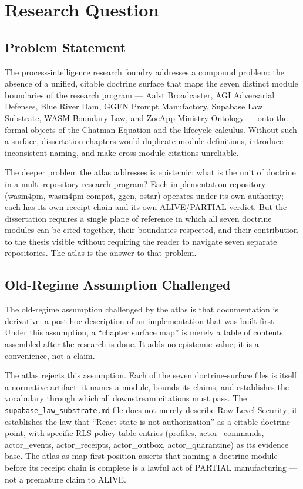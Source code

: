 
\section{Research Question}
\label{sec:atlas-rq}

\subsection{Problem Statement}
\label{sec:atlas-rq-problem}

The process-intelligence research foundry addresses a compound problem: the
absence of a unified, citable doctrine surface that maps the seven distinct
module boundaries of the research program --- Aalst Broadcaster, AGI Adversarial
Defenses, Blue River Dam, GGEN Prompt Manufactory, Supabase Law Substrate, WASM
Boundary Law, and ZoeApp Ministry Ontology --- onto the formal objects of the
Chatman Equation and the lifecycle calculus. Without such a surface, dissertation
chapters would duplicate module definitions, introduce inconsistent naming, and
make cross-module citations unreliable.

The deeper problem the atlas addresses is epistemic: what is the unit of
doctrine in a multi-repository research program? Each implementation repository
(wasm4pm, wasm4pm-compat, ggen, ostar) operates under its own authority; each
has its own receipt chain and its own ALIVE/PARTIAL verdict. But the
dissertation requires a single plane of reference in which all seven doctrine
modules can be cited together, their boundaries respected, and their
contribution to the thesis visible without requiring the reader to navigate seven
separate repositories. The atlas is the answer to that problem.

\subsection{Old-Regime Assumption Challenged}
\label{sec:atlas-rq-old-regime}

The old-regime assumption challenged by the atlas is that documentation is
derivative: a post-hoc description of an implementation that was built first.
Under this assumption, a ``chapter surface map'' is merely a table of contents
assembled after the research is done. It adds no epistemic value; it is a
convenience, not a claim.

The atlas rejects this assumption. Each of the seven doctrine-surface files is
itself a normative artifact: it names a module, bounds its claims, and
establishes the vocabulary through which all downstream citations must pass. The
\texttt{supabase\_law\_substrate.md} file does not merely describe Row Level
Security; it establishes the law that ``React state is not authorization'' as a
citable doctrine point, with specific RLS policy table entries (profiles,
actor\_commands, actor\_events, actor\_receipts, actor\_outbox,
actor\_quarantine) as its evidence base. The atlas-as-map-first position asserts
that naming a doctrine module before its receipt chain is complete is a lawful
act of PARTIAL manufacturing --- not a premature claim to ALIVE.


